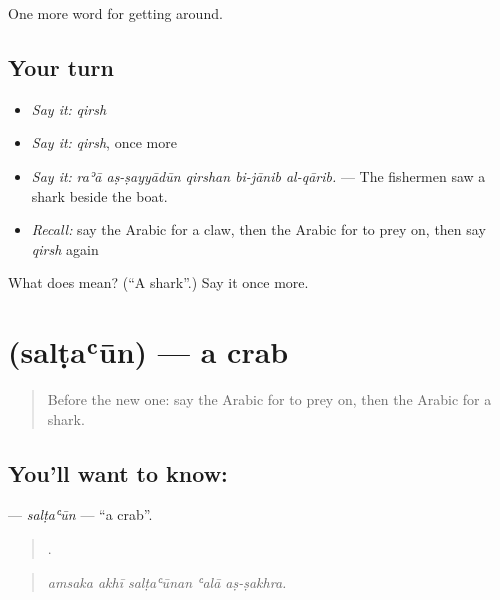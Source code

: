 \begin{grammarlens}[title={What you've built}]
One more word for getting around.
\end{grammarlens}

\subsection*{Your turn}
\begin{itemize}
\raggedright
  \item \emph{Say it:} \emph{qirsh}
  \item \emph{Say it:} \emph{qirsh}, once more
  \item \emph{Say it:} \emph{raʾā aṣ-ṣayyādūn qirshan bi-jānib al-qārib.} — The fishermen saw a shark beside the boat.
  \item \emph{Recall:} say the Arabic for a claw, then the Arabic for to prey on, then say \emph{qirsh} again
\end{itemize}

\begin{tcolorbox}[breakable,colback=teal!4,colframe=teal!35!black,title={Before you move on}]
What does  mean? (\textquotedblleft{}A shark\textquotedblright{}.) Say it once more.
\end{tcolorbox}
\section[\texorpdfstring{\ar{سلطعون} (salṭaʿūn)}{سلطعون (salṭaʿūn)}]{ (salṭaʿūn) — a crab}

\label{lesson:AR-C477-saltaun}



\begin{quote}
Before the new one: say the Arabic for to prey on, then the Arabic for a shark.
\end{quote}

\subsection*{You'll want to know: }
\textbf{} — \emph{salṭaʿūn} — \textquotedblleft{}a crab\textquotedblright{}.

\begin{quote}
    .
\end{quote}

\begin{quote}
\emph{amsaka akhī salṭaʿūnan ʿalā aṣ-ṣakhra.}
\end{quote}

